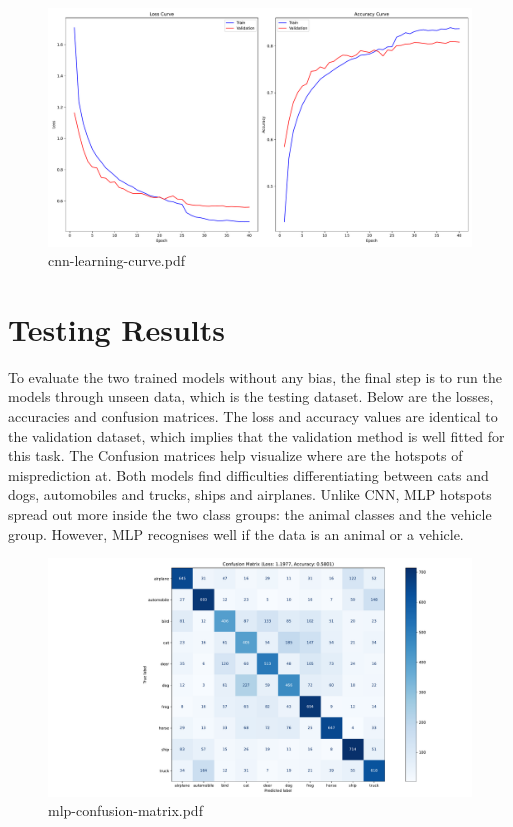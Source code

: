 \documentclass{report}
\begin{document}
\begin{figure}[ht!]
    \center
    \includegraphics[scale=0.4]{../output/cnn-learning-curve.pdf}
    \caption{cnn-learning-curve.pdf}
\end{figure}

\section{Testing Results}
To evaluate the two trained models without any bias, the final step is to run the models through unseen data, 
which is the testing dataset. Below are the losses, accuracies and confusion matrices. The loss and accuracy 
values are identical to the validation dataset, which implies that the validation method is well fitted for this task. 
The Confusion matrices help visualize where are the hotspots of misprediction at. Both models find difficulties differentiating 
between cats and dogs, automobiles and trucks, ships and airplanes. Unlike CNN, MLP hotspots spread out more inside the two class 
groups: the animal classes and the vehicle group. However, MLP recognises well if the data is an animal or a vehicle.

\begin{figure}[ht!]
    \center
    \includegraphics[scale=0.405]{../output/mlp-confusion-matrix.pdf}
    \caption{mlp-confusion-matrix.pdf}
\end{figure}
\end{document}
